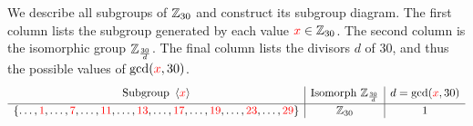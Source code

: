 \begin{example}{}{}
We describe all subgroups of $\mathbb{Z}_{30}$ and construct its subgroup diagram. The first column lists the subgroup generated by each value $\textcolor{red}{x}\in\mathbb{Z}_{30}$. The second column is the isomorphic group $\mathbb{Z}_{\frac{30}d}$. The final column lists the divisors $d$ of $30$, and thus the possible values of $\gcd(\textcolor{red}{x},30)$.
  \[\def\arraystretch{1.05}\begin{array}[t]{c|c|c}
    \text{Subgroup } \ip{\textcolor{red}{x}} & \text{Isomorph }\Z_{\frac{30}d} & d=\gcd(\textcolor{red}{x},30)  \\[3pt] \hline
 \{\ldots,\textcolor{red}{1},\ldots,\textcolor{red}{7},\ldots,\textcolor{red}{11},\ldots,\textcolor{red}{13},\ldots,\textcolor{red}{17},\ldots,\textcolor{red}{19},\ldots,\textcolor{red}{23},\ldots,\textcolor{red}{29}\} & \Z_{30} & 1\\

\end{array}\]
\end{example}
